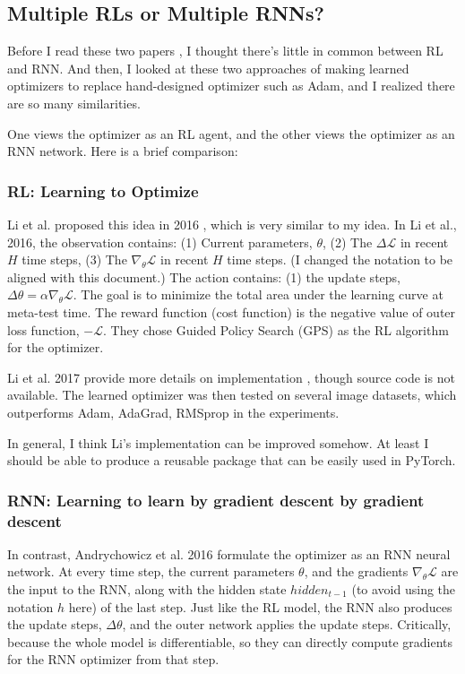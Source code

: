 \subsection{Multiple RLs or Multiple RNNs?}
Before I read these two papers \cite{li2017learning}\cite{andrychowicz2016learning}, I thought there's little in common between RL and RNN.
And then, I looked at these two approaches of making learned optimizers to replace hand-designed optimizer such as Adam, and I realized there are so many similarities.

One views the optimizer as an RL agent\cite{li2017learning}, and the other views the optimizer as an RNN network\cite{andrychowicz2016learning}.
Here is a brief comparison:

\subsubsection{RL: Learning to Optimize}
Li et al. proposed this idea in 2016 \cite{li2016learning}, which is very similar to my idea.
In Li et al., 2016, the observation contains: (1) Current parameters, $\theta$, (2) The $\Delta \mathcal{L}$ in recent $H$ time steps, (3) The $\nabla_{\theta} \mathcal{L}$ in recent $H$ time steps. (I changed the notation to be aligned with this document.)
The action contains: (1) the update steps, $\Delta \theta = \alpha \nabla_{\theta} \mathcal{L}$.
The goal is to minimize the total area under the learning curve at meta-test time.
The reward function (cost function) is the negative value of outer loss function, $- \mathcal{L}$.
They chose Guided Policy Search (GPS) as the RL algorithm for the optimizer.

Li et al. 2017 provide more details on implementation \cite{li2017learning}, though source code is not available.
The learned optimizer was then tested on several image datasets, which outperforms Adam, AdaGrad, RMSprop in the experiments.

In general, I think Li's implementation can be improved somehow. 
At least I should be able to produce a reusable package that can be easily used in PyTorch.

\subsubsection{RNN: Learning to learn by gradient descent by gradient descent}
In contrast, Andrychowicz et al. 2016\cite{andrychowicz2016learning} formulate the optimizer as an RNN neural network.
At every time step, the current parameters $\theta$, and the gradients $\nabla_\theta \mathcal{L}$ are the input to the RNN, along with the hidden state $hidden_{t-1}$ (to avoid using the notation $h$ here) of the last step.
Just like the RL model, the RNN also produces the update steps, $\Delta \theta$, and the outer network applies the update steps.
Critically, because the whole model is differentiable, so they can directly compute gradients for the RNN optimizer from that step.

